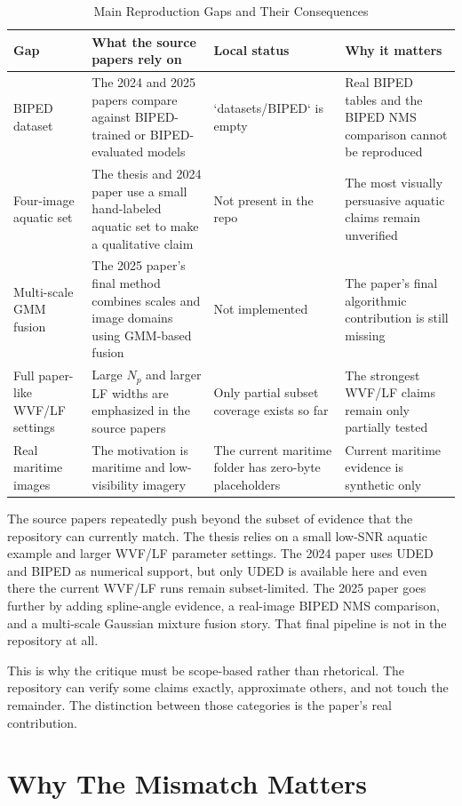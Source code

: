 \documentclass[conference]{IEEEtran}
\begin{document}
\begin{table}[t]
\centering
\caption{Main Reproduction Gaps and Their Consequences}
\label{tab:gaps}
\scriptsize
\begin{tabular}{P{3.2cm}P{4.1cm}P{3.6cm}P{4.2cm}}
\toprule
Gap & What the source papers rely on & Local status & Why it matters \\
\midrule
BIPED dataset & The 2024 and 2025 papers compare against BIPED-trained or BIPED-evaluated models & `datasets/BIPED` is empty & Real BIPED tables and the BIPED NMS comparison cannot be reproduced \\
Four-image aquatic set & The thesis and 2024 paper use a small hand-labeled aquatic set to make a qualitative claim & Not present in the repo & The most visually persuasive aquatic claims remain unverified \\
Multi-scale GMM fusion & The 2025 paper's final method combines scales and image domains using GMM-based fusion & Not implemented & The paper's final algorithmic contribution is still missing \\
Full paper-like WVF/LF settings & Large $N_p$ and larger LF widths are emphasized in the source papers & Only partial subset coverage exists so far & The strongest WVF/LF claims remain only partially tested \\
Real maritime images & The motivation is maritime and low-visibility imagery & The current maritime folder has zero-byte placeholders & Current maritime evidence is synthetic only \\
\bottomrule
\end{tabular}
\end{table}

The source papers repeatedly push beyond the subset of evidence that the repository can currently match. The thesis relies on a small low-SNR aquatic example and larger WVF/LF parameter settings. The 2024 paper uses UDED and BIPED as numerical support, but only UDED is available here and even there the current WVF/LF runs remain subset-limited. The 2025 paper goes further by adding spline-angle evidence, a real-image BIPED NMS comparison, and a multi-scale Gaussian mixture fusion story. That final pipeline is not in the repository at all.

This is why the critique must be scope-based rather than rhetorical. The repository can verify some claims exactly, approximate others, and not touch the remainder. The distinction between those categories is the paper's real contribution.

\section{Why The Mismatch Matters}
\end{document}
